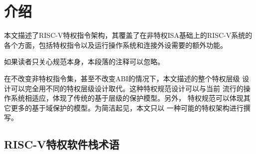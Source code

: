 \chapter{ 介绍
}


本文描述了RISC-V特权指令架构，其覆盖了在非特权ISA基础上的RISC-V系统的
各个方面，包括特权指令以及运行操作系统和连接外设需要的额外功能。

\begin{commentary}

如果读者只关心规范本身，本段落的注释可以忽略。
\end{commentary}

\begin{commentary}

在不改变非特权指令集，甚至不改变ABI的情况下，本文描述的整个特权层级
设计可以完全用不同的特权层级设计取代。这种特权规范设计可以与当前
流行的操作系统相适应，体现了传统的基于层级的保护模型。另外，
特权规范可以体现其它更多的基于域保护的模型。为简洁起见，本文只以
一种可能的特权架构进行撰写。
\end{commentary}

\section{ RISC-V特权软件栈术语
  }


